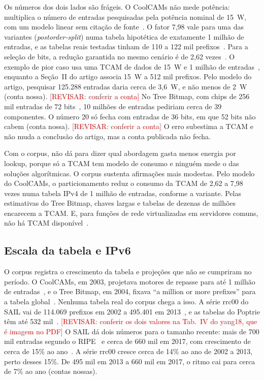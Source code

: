 \documentclass[conference,a4paper]{IEEEtran}
\newcommand{\revisar}[1]{\textcolor{red}{[REVISAR: #1]}}
\begin{document}
Os números dos dois lados são frágeis. O CoolCAMs não mede potência: multiplica o número de entradas pesquisadas pela
potência nominal de 15~W, com um modelo linear sem citação de fonte~\cite[\S II, \S IV-D]{zane03}. O fator 7,98 vale para
uma das variantes (\textit{postorder-split}) numa tabela hipotética de exatamente 1 milhão de entradas, e as tabelas reais
testadas tinham de 110 a 122 mil prefixos~\cite[Tab.~II]{zane03}. Para a seleção de bits, a redução garantida no mesmo
cenário é de 2,62 vezes~\cite[\S III-B]{zane03}. O exemplo de pior caso usa uma TCAM de dados de 15~W e 1 milhão de
entradas~\cite[\S IV-D]{zane03}, enquanto a Seção~II do artigo associa 15~W a 512 mil prefixos. Pelo modelo do artigo,
pesquisar 125.288 entradas daria cerca de 3,6~W, e não menos de 2~W (conta nossa). \revisar{conferir a conta} No Tree
Bitmap, com chips de 256 mil entradas de 72 bits~\cite[\S2.3.3]{eath04}, 10 milhões de entradas pediriam cerca de 39
componentes. O número 20 só fecha com entradas de 36 bits, em que 52 bits não cabem (conta nossa).
\revisar{conferir a conta} O erro subestima a TCAM e não muda a conclusão do artigo, mas a conta publicada não fecha.

Com o corpus, não dá para dizer qual abordagem gasta menos energia por lookup, porque só a TCAM tem modelo de consumo e
ninguém mede o das soluções algorítmicas. O corpus sustenta afirmações mais modestas. Pelo modelo do CoolCAMs, o
particionamento reduz o consumo da TCAM de 2,62 a 7,98 vezes numa tabela IPv4 de 1 milhão de entradas, conforme a
variante. Pelas estimativas do Tree Bitmap, chaves largas e tabelas de dezenas de milhões encarecem a TCAM. E, para
funções de rede virtualizadas em servidores comuns, não há TCAM disponível~\cite[\S1]{asai15}.

\subsection{Escala da tabela e IPv6}
O corpus registra o crescimento da tabela e projeções que não se cumpriram no período. O CoolCAMs, em 2003, projetava
motores de repasse para até 1 milhão de entradas~\cite[\S II]{zane03}, e o Tree Bitmap, em 2004, fixava ``a million or
more prefixes'' para a tabela global~\cite[\S2.2]{eath04}. Nenhuma tabela real do corpus chega a isso. A série rrc00 do
SAIL vai de 114.069 prefixos em 2002 a 495.401 em 2013~\cite[Tab.~IV]{yang18}, e as tabelas do Poptrie têm até 532
mil~\cite[Tab.~1]{asai15}. \revisar{conferir os dois valores na Tab.~IV do yang18, que é imagem no PDF} O SAIL dá dois
números para o tamanho recente: mais de 700 mil entradas segundo o RIPE~\cite[\S I-A]{yang18} e cerca de 660 mil em 2017,
com crescimento de cerca de 15\% ao ano~\cite[\S VII-C]{yang18}. A série rrc00 cresce cerca de 14\% ao ano de 2002 a 2013,
perto desses 15\%. De 495 mil em 2013 a 660 mil em 2017, o ritmo cai para cerca de 7\% ao ano (contas nossas).
\end{document}
